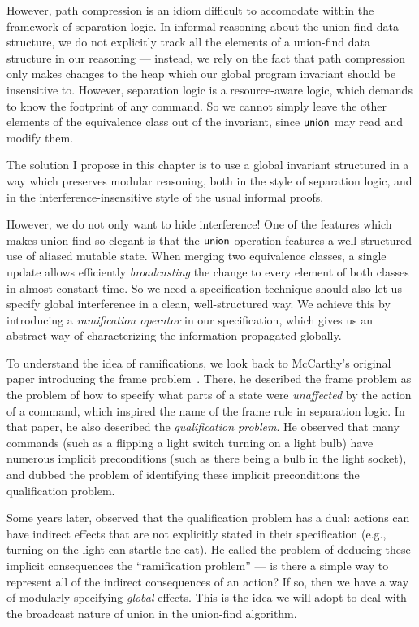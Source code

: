 However, path compression is an idiom difficult to accomodate within
the framework of separation logic. In informal reasoning about the
union-find data structure, we do not explicitly track all the elements
of a union-find data structure in our reasoning --- instead, we rely
on the fact that path compression only makes changes to the heap which
our global program invariant should be insensitive to. However,
separation logic is a resource-aware logic, which demands to know the
footprint of any command. So we cannot simply leave the other elements
of the equivalence class out of the invariant, since $\mathsf{union}$ may read
and modify them.

The solution I propose in this chapter is to use a global invariant
structured in a way which preserves modular reasoning, both in the
style of separation logic, and in the interference-insensitive style
of the usual informal proofs. 

However, we do not only want to hide interference! One of the features
which makes union-find so elegant is that the $\mathsf{union}$ operation
features a well-structured use of aliased mutable state.  When merging
two equivalence classes, a single update allows efficiently
\emph{broadcasting} the change to every element of both classes in
almost constant time.  So we need a specification technique should also
let us specify global interference in a clean, well-structured way. We
achieve this by introducing a \emph{ramification operator} in our
specification, which gives us an abstract way of characterizing the
information propagated globally.

To understand the idea of ramifications, we look back to McCarthy's
original paper introducing the frame problem~\cite{mccarthy}. There,
he described the frame problem as the problem of how to specify what
parts of a state were \emph{unaffected} by the action of a command,
which inspired the name of the frame rule in separation logic. In that
paper, he also described the \emph{qualification problem}. He observed
that many commands (such as a flipping a light switch turning on a
light bulb) have numerous implicit preconditions (such as there being
a bulb in the light socket), and dubbed the problem of identifying
these implicit preconditions the qualification problem.

Some years later, \citet{finger} observed that the qualification
problem has a dual: actions can have indirect effects that are not
explicitly stated in their specification (e.g., turning on the light can
startle the cat). He called the problem of deducing these implicit
consequences the ``ramification problem'' --- is there a simple way to
represent all of the indirect consequences of an action? If so, then 
we have a way of modularly specifying \emph{global} effects. This is
the idea we will adopt to deal with the broadcast nature of \textsf{union}
in the union-find algorithm. 

